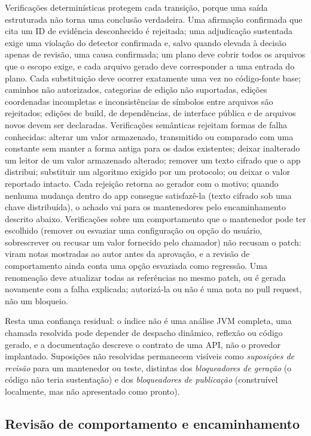 \documentclass[conference]{IEEEtran}
\begin{document}
Verificações determinísticas protegem cada transição, porque uma saída
estruturada não torna uma conclusão verdadeira. Uma afirmação confirmada que
cita um ID de evidência desconhecido é rejeitada; uma adjudicação sustentada
exige uma violação do detector confirmada e, salvo quando elevada à decisão
apenas de revisão, uma causa confirmada; um plano deve cobrir
todos os arquivos que o escopo exige, e cada arquivo gerado deve corresponder a
uma entrada do plano. Cada substituição deve ocorrer exatamente uma vez no
código-fonte base; caminhos não autorizados, categorias de edição não
suportadas, edições coordenadas incompletas e inconsistências de símbolos entre
arquivos são rejeitados; edições de build, de dependências, de interface
pública e de arquivos novos devem ser declaradas. Verificações
semânticas rejeitam formas de falha conhecidas: alterar um valor armazenado,
transmitido ou comparado com uma constante sem manter a forma antiga para os
dados existentes; deixar inalterado um leitor de um valor armazenado alterado;
remover um texto cifrado que o app distribui; substituir um algoritmo exigido
por um protocolo; ou deixar o valor reportado intacto. Cada rejeição retorna ao
gerador com o motivo; quando nenhuma mudança dentro do app consegue satisfazê-la
(texto cifrado sob uma chave distribuída), o achado vai para os mantenedores
pelo encaminhamento descrito abaixo. Verificações sobre um comportamento que o
mantenedor pode ter escolhido (remover ou esvaziar uma configuração ou opção do
usuário, sobrescrever ou recusar um valor fornecido pelo chamador) não recusam o
patch: viram notas mostradas ao autor antes da aprovação, e a revisão de
comportamento ainda conta uma opção esvaziada como regressão. Uma
renomeação deve atualizar todas as referências no mesmo patch, ou é gerada
novamente com a falha explicada; autorizá-la ou não é uma nota no pull request,
não um bloqueio.

Resta uma confiança residual: o índice não é uma análise JVM completa, uma chamada resolvida
pode depender de despacho dinâmico, reflexão ou código gerado, e a documentação
descreve o contrato de uma API, não o provedor implantado. Suposições não
resolvidas permanecem visíveis como \emph{suposições de revisão} para um
mantenedor ou teste, distintas dos \emph{bloqueadores de geração} (o código não
teria sustentação) e dos \emph{bloqueadores de publicação} (construível
localmente, mas não apresentado como pronto).

\subsection{Revisão de comportamento e encaminhamento}
\end{document}
